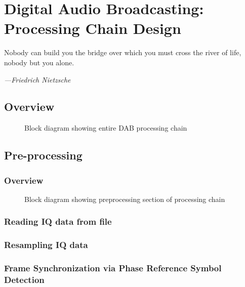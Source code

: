 \documentclass[class=report,11pt,crop=false]{standalone}
\begin{document}
\ifstandalone
\tableofcontents
\fi
\chapter{Digital Audio Broadcasting: Processing Chain Design}
\epigraph{Nobody can build you the bridge over which you must cross the river of life, nobody but you alone.}%
    {\emph{---Friedrich Nietzsche}}

\section{Overview}

\begin{figure}[htbp]
    \centering
    \def\svgwidth{\linewidth}
    { %
        }
    \caption{Block diagram showing entire DAB processing chain}
    \label{fig:BD_Overview_All}
\end{figure}

\section{Pre-processing \label{sect:dab-proc_preprocessing}}
\subsection{Overview}

\begin{figure}[htbp]
    \centering
    \def\svgwidth{\linewidth}
    { %
        }
    \caption{Block diagram showing preprocessing section of processing chain}
    \label{fig:BD_Preprocess_All}
\end{figure}

\subsection{Reading IQ data from file \label{subsect:dab-proc_iq-read}}


\subsection{Resampling IQ data \label{subsect:dab-proc_iq-resample}}


\subsection{Frame Synchronization via Phase Reference Symbol Detection \label{subsect:dab-proc_prs-detect}}
\end{document}
